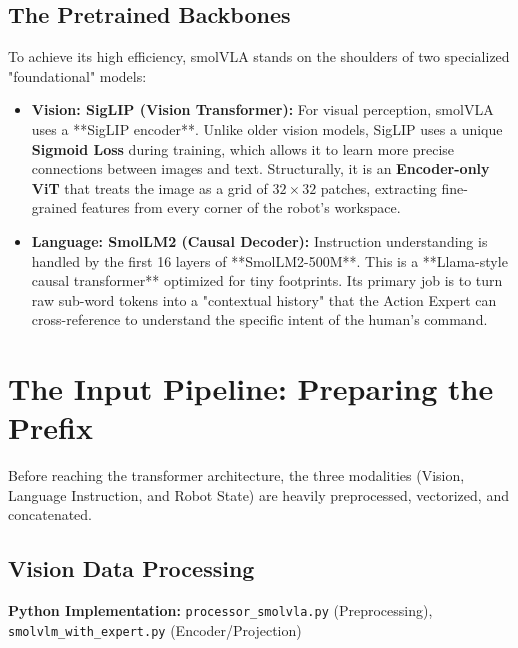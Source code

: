 \documentclass[11pt,a4paper]{article}
\begin{document}
\subsection{The Pretrained Backbones}
To achieve its high efficiency, smolVLA stands on the shoulders of two specialized "foundational" models:

\begin{itemize}
    \item \textbf{Vision: SigLIP (Vision Transformer):} For visual perception, smolVLA uses a **SigLIP encoder**. Unlike older vision models, SigLIP uses a unique \textbf{Sigmoid Loss} during training, which allows it to learn more precise connections between images and text. Structurally, it is an \textbf{Encoder-only ViT} that treats the image as a grid of $32 \times 32$ patches, extracting fine-grained features from every corner of the robot's workspace.
    \item \textbf{Language: SmolLM2 (Causal Decoder):} Instruction understanding is handled by the first 16 layers of **SmolLM2-500M**. This is a **Llama-style causal transformer** optimized for tiny footprints. Its primary job is to turn raw sub-word tokens into a "contextual history" that the Action Expert can cross-reference to understand the specific intent of the human's command.
\end{itemize}

\section{The Input Pipeline: Preparing the Prefix}
Before reaching the transformer architecture, the three modalities (Vision, Language Instruction, and Robot State) are heavily preprocessed, vectorized, and concatenated.

\subsection{Vision Data Processing}
\textbf{Python Implementation:} \texttt{processor\_smolvla.py} (Preprocessing), \texttt{smolvlm\_with\_expert.py} (Encoder/Projection)
\end{document}
